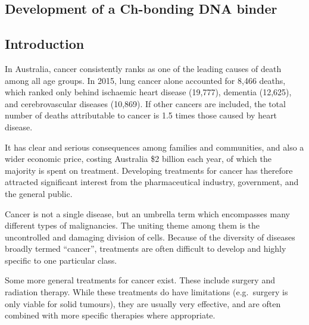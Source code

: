\begin{refsection}

\chapter{Development of a Ch-bonding DNA binder}\label{ch:dna-binder}

\section{Introduction}

In Australia, cancer consistently ranks as one of the leading causes of death among all age groups. In 2015, lung cancer alone accounted for 8,466 deaths, which ranked only behind ischaemic heart disease (19,777), dementia (12,625), and cerebrovascular diseases (10,869).
If other cancers are included, the total number of deaths attributable to cancer is 1.5 times those caused by heart disease\autocite{abs2015}.

It has clear and serious consequences among families and communities, and also a wider economic price, costing Australia \$2 billion each year, of which the majority is spent on treatment\autocite{Mathers1998}.
Developing treatments for cancer has therefore attracted significant interest from the pharmaceutical industry, government, and the general public\autocite{Rankin2015}.

Cancer is not a single disease, but an umbrella term which encompasses many different types of malignancies.
The uniting theme among them is the uncontrolled and damaging division of cells.
Because of the diversity of diseases broadly termed ``cancer'', treatments are often difficult to develop and highly specific to one particular class\autocite{Hanahan2011}.

Some more general treatments for cancer exist.
These include surgery and radiation therapy.
While these treatments do have limitations (e.g.\ surgery is only viable for solid tumours), they are usually very effective, and are often combined with more specific therapies where appropriate.



\end{refsection}
